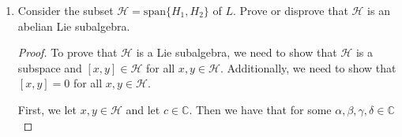 \documentclass[12pt]{article}
\theoremstyle{definition}
\newenvironment{solution}
{\renewcommand\qedsymbol{$\blacksquare$}\begin{proof}[Solution]}
{\end{proof}}
\begin{document}
\begin{enumerate}
\begin{enumerate}[label=(\alph*)]
\begin{solution}
\begin{equation*}
\begin{split}
\begin{pmatrix}
                                \end{pmatrix}-\begin{pmatrix}0&0&0\\0&0&0\\1&0&0\end{pmatrix}
                                \begin{pmatrix}0&0&0\\0&1&0\\0&0&-1
                                \end{pmatrix}=-Y_3 \\ 
                            \end{split}
                        \end{equation*}
                        Thus, we can express $\text{ad}_{H_2}$ as 
                            \begin{equation*}
                                \text{ad}_{H_2}=\begin{pmatrix}0&0&0&0&0&0&0&0\\0&0&0&0&0&0&0&0\\0&0&-1&0&0&0&0&0\\0&0&0&2&0&0&0&0\\0&0&0&0&1&0&0&0\\0&0&0&0&0&1&0&0\\0&0&0&0&0&0&-2&0\\0&0&0&0&0&0&0&-1\end{pmatrix}
                            \end{equation*}
                    \end{solution}
                \item Consider the subset $\mathcal{H}=\text{span}\{H_1, H_2\}$
                    of $L$. Prove or disprove that $\mathcal{H}$ is an abelian
                    Lie subalgebra.
                    \begin{proof}
                        To prove that $\mathcal{H}$ is a Lie subalgebra, we
                        need to show that $\mathcal{H}$ is a subspace and $[x,
                        y]\in\mathcal{H}$ for all $x, y\in\mathcal{H}$.
                        Additionally, we need to show that $[x, y]=0$ for all
                        $x, y\in\mathcal{H}$.\par\hspace{4mm} First, we let
                        $x, y\in\mathcal{H}$ and let $c\in\mathbb{C}$. Then we
                        have that for some $\alpha, \beta, \gamma, \delta\in\mathbb{C}$

\end{proof}
\end{enumerate}
\end{enumerate}
\end{document}
